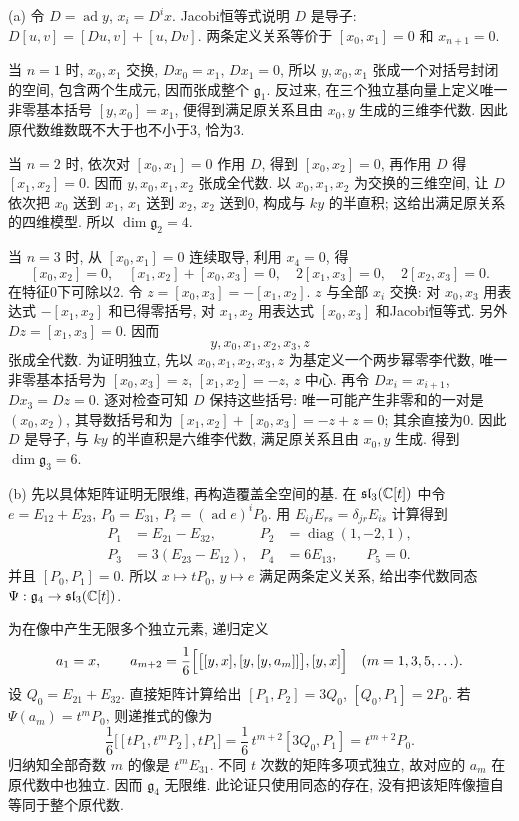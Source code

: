 \begin{solution}
(a) 令 $D=\operatorname{ad}y$, $x_i=D^ix$. Jacobi恒等式说明 $D$ 是导子: $D[u,v]=[Du,v]+[u,Dv]$. 两条定义关系等价于 $[x_0,x_1]=0$ 和 $x_{n+1}=0$.

当 $n=1$ 时, $x_0,x_1$ 交换, $Dx_0=x_1$, $Dx_1=0$, 所以 $y,x_0,x_1$ 张成一个对括号封闭的空间, 包含两个生成元, 因而张成整个 $\mathfrak g_1$. 反过来, 在三个独立基向量上定义唯一非零基本括号 $[y,x_0]=x_1$, 便得到满足原关系且由 $x_0,y$ 生成的三维李代数. 因此原代数维数既不大于也不小于3, 恰为3.

当 $n=2$ 时, 依次对 $[x_0,x_1]=0$ 作用 $D$, 得到 $[x_0,x_2]=0$, 再作用 $D$ 得 $[x_1,x_2]=0$. 因而 $y,x_0,x_1,x_2$ 张成全代数. 以 $x_0,x_1,x_2$ 为交换的三维空间, 让 $D$ 依次把 $x_0$ 送到 $x_1$, $x_1$ 送到 $x_2$, $x_2$ 送到0, 构成与 $ky$ 的半直积; 这给出满足原关系的四维模型. 所以 $\dim\mathfrak g_2=4$.

当 $n=3$ 时, 从 $[x_0,x_1]=0$ 连续取导, 利用 $x_4=0$, 得
\[
[x_0,x_2]=0,\quad [x_1,x_2]+[x_0,x_3]=0,
\quad 2[x_1,x_3]=0,\quad 2[x_2,x_3]=0.
\]
在特征0下可除以2. 令 $z=[x_0,x_3]=-[x_1,x_2]$. $z$ 与全部 $x_i$ 交换: 对 $x_0,x_3$ 用表达式 $-[x_1,x_2]$ 和已得零括号, 对 $x_1,x_2$ 用表达式 $[x_0,x_3]$ 和Jacobi恒等式. 另外 $Dz=[x_1,x_3]=0$. 因而
\[
y,x_0,x_1,x_2,x_3,z
\]
张成全代数. 为证明独立, 先以 $x_0,x_1,x_2,x_3,z$ 为基定义一个两步幂零李代数, 唯一非零基本括号为 $[x_0,x_3]=z$, $[x_1,x_2]=-z$, $z$ 中心. 再令 $Dx_i=x_{i+1}$, $Dx_3=Dz=0$. 逐对检查可知 $D$ 保持这些括号: 唯一可能产生非零和的一对是 $(x_0,x_2)$, 其导数括号和为 $[x_1,x_2]+[x_0,x_3]=-z+z=0$; 其余直接为0. 因此 $D$ 是导子, 与 $ky$ 的半直积是六维李代数, 满足原关系且由 $x_0,y$ 生成. 得到 $\dim\mathfrak g_3=6$.

(b) 先以具体矩阵证明无限维, 再构造覆盖全空间的基. 在 $\mathfrak{sl}_3(\mathbb C[t])$ 中令 $e=E_{12}+E_{23}$, $P_0=E_{31}$, $P_i=(\operatorname{ad}e)^iP_0$. 用 $E_{ij}E_{rs}=\delta_{jr}E_{is}$ 计算得到
\begin{align*}
P_1&=E_{21}-E_{32},&P_2&=\operatorname{diag}(1,-2,1),\\
P_3&=3(E_{23}-E_{12}),&P_4&=6E_{13},\qquad P_5=0.
\end{align*}
并且 $[P_0,P_1]=0$. 所以 $x\mapsto tP_0$, $y\mapsto e$ 满足两条定义关系, 给出李代数同态 $\Psi:\mathfrak g_4\to\mathfrak{sl}_3(\mathbb C[t])$.

为在像中产生无限多个独立元素, 递归定义
\[
a_1=x,\qquad
a_{m+2}=\frac16
\Bigl[\bigl[[y,x],[y,[y,a_m]]\bigr],[y,x]\Bigr]
\quad(m=1,3,5,\ldots).
\]
设 $Q_0=E_{21}+E_{32}$. 直接矩阵计算给出 $[P_1,P_2]=3Q_0$, $[Q_0,P_1]=2P_0$. 若 $\Psi(a_m)=t^mP_0$, 则递推式的像为
\[
\frac16\bigl[[tP_1,t^mP_2],tP_1\bigr]
=\frac16\,t^{m+2}[3Q_0,P_1]=t^{m+2}P_0.
\]
归纳知全部奇数 $m$ 的像是 $t^mE_{31}$. 不同 $t$ 次数的矩阵多项式独立, 故对应的 $a_m$ 在原代数中也独立. 因而 $\mathfrak g_4$ 无限维. 此论证只使用同态的存在, 没有把该矩阵像擅自等同于整个原代数.


\end{solution}
